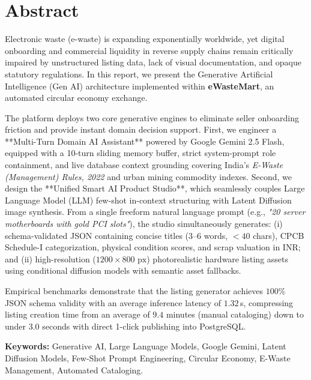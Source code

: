\documentclass[12pt,a4paper]{article}
\begin{document}
\section{Abstract}
Electronic waste (e-waste) is expanding exponentially worldwide, yet digital onboarding and commercial liquidity in reverse supply chains remain critically impaired by unstructured listing data, lack of visual documentation, and opaque statutory regulations. In this report, we present the Generative Artificial Intelligence (Gen AI) architecture implemented within \textbf{eWasteMart}, an automated circular economy exchange. 

The platform deploys two core generative engines to eliminate seller onboarding friction and provide instant domain decision support. First, we engineer a **Multi-Turn Domain AI Assistant** powered by Google Gemini 2.5 Flash, equipped with a 10-turn sliding memory buffer, strict system-prompt role containment, and live database context grounding covering India's \textit{E-Waste (Management) Rules, 2022} and urban mining commodity indexes. Second, we design the **Unified Smart AI Product Studio**, which seamlessly couples Large Language Model (LLM) few-shot in-context structuring with Latent Diffusion image synthesis. From a single freeform natural language prompt (e.g., \textit{"20 server motherboards with gold PCI slots"}), the studio simultaneously generates: (i) schema-validated JSON containing concise titles ($3\text{--}6$ words, $<40$ chars), CPCB Schedule-I categorization, physical condition scores, and scrap valuation in INR; and (ii) high-resolution ($1200\times 800\text{ px}$) photorealistic hardware listing assets using conditional diffusion models with semantic asset fallbacks. 

Empirical benchmarks demonstrate that the listing generator achieves $100\%$ JSON schema validity with an average inference latency of $1.32$\,s, compressing listing creation time from an average of $9.4$ minutes (manual cataloging) down to under $3.0$ seconds with direct 1-click publishing into PostgreSQL.

\vspace{0.5cm}
\noindent\textbf{Keywords:} Generative AI, Large Language Models, Google Gemini, Latent Diffusion Models, Few-Shot Prompt Engineering, Circular Economy, E-Waste Management, Automated Cataloging.

\end{document}
